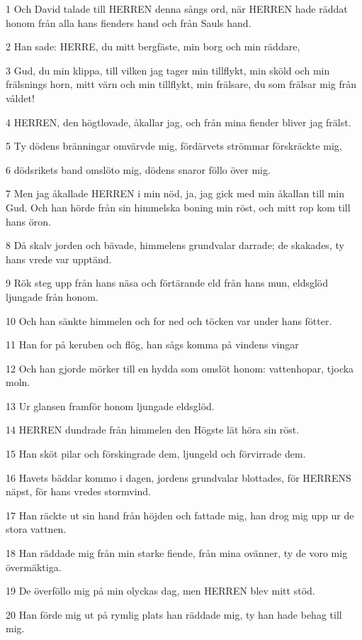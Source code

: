 \par 1 Och David talade till HERREN denna sångs ord, när HERREN hade räddat honom från alla hans fienders hand och från Sauls hand.
\par 2 Han sade: HERRE, du mitt bergfäste, min borg och min räddare,
\par 3 Gud, du min klippa, till vilken jag tager min tillflykt, min sköld och min frälsnings horn, mitt värn och min tillflykt, min frälsare, du som frälsar mig från våldet!
\par 4 HERREN, den högtlovade, åkallar jag, och från mina fiender bliver jag frälst.
\par 5 Ty dödens bränningar omvärvde mig, fördärvets strömmar förskräckte mig,
\par 6 dödsrikets band omslöto mig, dödens snaror föllo över mig.
\par 7 Men jag åkallade HERREN i min nöd, ja, jag gick med min åkallan till min Gud. Och han hörde från sin himmelska boning min röst, och mitt rop kom till hans öron.
\par 8 Då skalv jorden och bävade, himmelens grundvalar darrade; de skakades, ty hans vrede var upptänd.
\par 9 Rök steg upp från hans näsa och förtärande eld från hans mun, eldsglöd ljungade från honom.
\par 10 Och han sänkte himmelen och for ned och töcken var under hans fötter.
\par 11 Han for på keruben och flög, han sågs komma på vindens vingar
\par 12 Och han gjorde mörker till en hydda som omslöt honom: vattenhopar, tjocka moln.
\par 13 Ur glansen framför honom ljungade eldsglöd.
\par 14 HERREN dundrade från himmelen den Högste lät höra sin röst.
\par 15 Han sköt pilar och förskingrade dem, ljungeld och förvirrade dem.
\par 16 Havets bäddar kommo i dagen, jordens grundvalar blottades, för HERRENS näpst, för hans vredes stormvind.
\par 17 Han räckte ut sin hand från höjden och fattade mig, han drog mig upp ur de stora vattnen.
\par 18 Han räddade mig från min starke fiende, från mina ovänner, ty de voro mig övermäktiga.
\par 19 De överföllo mig på min olyckas dag, men HERREN blev mitt stöd.
\par 20 Han förde mig ut på rymlig plats han räddade mig, ty han hade behag till mig.
